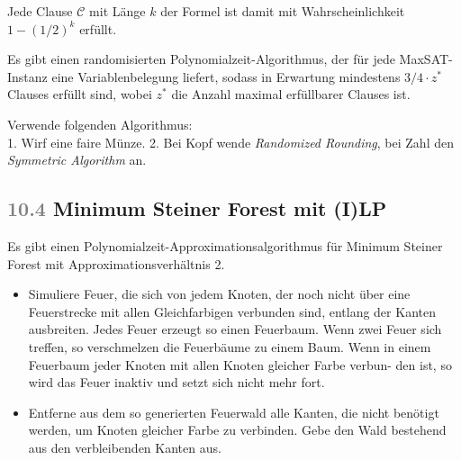 \documentclass{cheat-sheet}
\newcommand{\Problem}[1]{\textcolor{ProblemColor}{\textbf{#1}}}
\newcommand{\scriptSection}[1]{\textcolor{gray}{#1}\enspace}
\begin{document}
\begin{bem}
  Jede Clause $\mathcal{C}$ mit Länge $k$ der Formel ist damit mit Wahrscheinlichkeit $1 - (1/2)^k$ erfüllt.
\end{bem}

\begin{satz}
  Es gibt einen randomisierten Polynomialzeit-Algorithmus, der für jede MaxSAT-Instanz eine Variablenbelegung liefert, sodass in Erwartung mindestens $3/4 \cdot z^*$ Clauses erfüllt sind, wobei $z^*$ die Anzahl maximal erfüllbarer Clauses ist.
\end{satz}

\begin{beweis}
  Verwende folgenden Algorithmus: \\[0.2em]
  1. Wirf eine faire Münze.
  2. Bei Kopf wende \textit{Randomized Rounding}, bei Zahl den \textit{Symmetric Algorithm} an.
\end{beweis}

\subsection{\scriptSection{10.4} \Problem{Minimum Steiner Forest} mit (I)LP}

\begin{satz}
  Es gibt einen Polynomialzeit-Approximationsalgorithmus für Minimum Steiner Forest mit Approximationsverhältnis 2.
\end{satz}

\begin{alg}
  \begin{itemize}
    \item Simuliere Feuer, die sich von jedem Knoten, der noch nicht über eine Feuerstrecke mit allen Gleichfarbigen verbunden sind, entlang der Kanten ausbreiten.
    Jedes Feuer erzeugt so einen Feuerbaum.
    Wenn zwei Feuer sich treffen, so verschmelzen die Feuerbäume zu einem Baum.
    Wenn in einem Feuerbaum jeder Knoten mit allen Knoten gleicher Farbe verbun- den ist, so wird das Feuer inaktiv und setzt sich nicht mehr fort.
    \item
      Entferne aus dem so generierten Feuerwald alle Kanten, die nicht benötigt werden, um Knoten gleicher Farbe zu verbinden.
      Gebe den Wald bestehend aus den verbleibenden Kanten aus.
  \end{itemize}
\end{alg}
\end{document}
